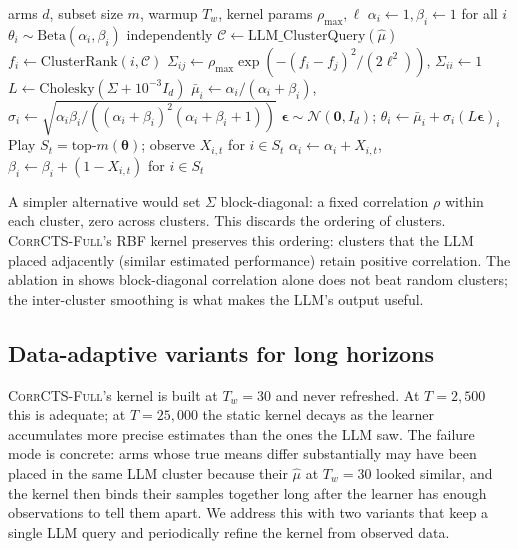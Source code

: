 \documentclass{article}
\theoremstyle{plain}
\theoremstyle{definition}
\theoremstyle{remark}
\newcommand{\CorrFull}{\textsc{CorrCTS-Full}}
\begin{document}
\begin{algorithm}[t]
\caption{\CorrFull{}}
\label{alg:corrfull}
\begin{algorithmic}[1]
\REQUIRE arms $d$, subset size $m$, warmup $T_w$, kernel params $\rho_{\max}, \ell$
\STATE $\alpha_i \gets 1, \beta_i \gets 1$ for all $i$
    \STATE $\theta_i \sim \text{Beta}(\alpha_i, \beta_i)$ independently
    \STATE $\mathcal{C} \gets \text{LLM\_ClusterQuery}(\hat\mu)$
    \STATE $f_i \gets \text{ClusterRank}(i, \mathcal{C})$
    \STATE $\Sigma_{ij} \gets \rho_{\max}\exp(-(f_i - f_j)^2/(2\ell^2))$, $\Sigma_{ii} \gets 1$
    \STATE $L \gets \text{Cholesky}(\Sigma + 10^{-3} I_d)$
  \ENDIF
    \STATE $\bar\mu_i \gets \alpha_i / (\alpha_i+\beta_i)$, $\sigma_i \gets \sqrt{\alpha_i\beta_i/((\alpha_i+\beta_i)^2(\alpha_i+\beta_i+1))}$
    \STATE $\boldsymbol{\epsilon} \sim \mathcal{N}(\mathbf{0}, I_d)$; $\theta_i \gets \bar\mu_i + \sigma_i (L\boldsymbol{\epsilon})_i$
  \ENDIF
  \STATE Play $S_t = \text{top-}m(\boldsymbol{\theta})$; observe $X_{i,t}$ for $i \in S_t$
  \STATE $\alpha_i \gets \alpha_i + X_{i,t}$, $\beta_i \gets \beta_i + (1 - X_{i,t})$ for $i \in S_t$
\ENDFOR
\end{algorithmic}
\end{algorithm}

A simpler alternative would set $\Sigma$ block-diagonal: a fixed correlation $\rho$ within each cluster, zero across clusters.
This discards the ordering of clusters.
\CorrFull{}'s RBF kernel preserves this ordering: clusters that the LLM placed adjacently (similar estimated performance) retain positive correlation.
The ablation in  shows block-diagonal correlation alone does not beat random clusters; the inter-cluster smoothing is what makes the LLM's output useful.

\subsection{Data-adaptive variants for long horizons}\label{sec:adaptive}

\CorrFull{}'s kernel is built at $T_w = 30$ and never refreshed.
At $T = 2{,}500$ this is adequate; at $T = 25{,}000$ the static kernel decays as the learner accumulates more precise estimates than the ones the LLM saw.
The failure mode is concrete: arms whose true means differ substantially may have been placed in the same LLM cluster because their $\hat\mu$ at $T_w = 30$ looked similar, and the kernel then binds their samples together long after the learner has enough observations to tell them apart.
We address this with two variants that keep a single LLM query and periodically refine the kernel from observed data.
\end{document}
